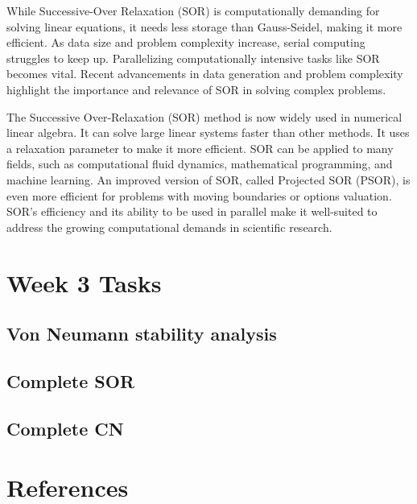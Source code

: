 \documentclass[11pt]{article}
\begin{document}
While Successive-Over Relaxation (SOR) is computationally demanding for solving linear equations, it needs less storage than Gauss-Seidel, making it more efficient. As data size and problem complexity increase, serial computing struggles to keep up. Parallelizing computationally intensive tasks like SOR becomes vital. Recent advancements in data generation and problem complexity highlight the importance and relevance of SOR in solving complex problems.

The Successive Over-Relaxation (SOR) method is now widely used in numerical linear algebra. It can solve large linear systems faster than other methods. It uses a relaxation parameter to make it more efficient. SOR can be applied to many fields, such as computational fluid dynamics, mathematical programming, and machine learning. An improved version of SOR, called Projected SOR (PSOR), is even more efficient for problems with moving boundaries or options valuation. SOR's efficiency and its ability to be used in parallel make it well-suited to address the growing computational demands in scientific research.

\section{Week 3 Tasks} %

\subsection{Von Neumann stability analysis}

\subsection{Complete SOR}

\subsection{Complete CN}
\section{References}
\end{document}

